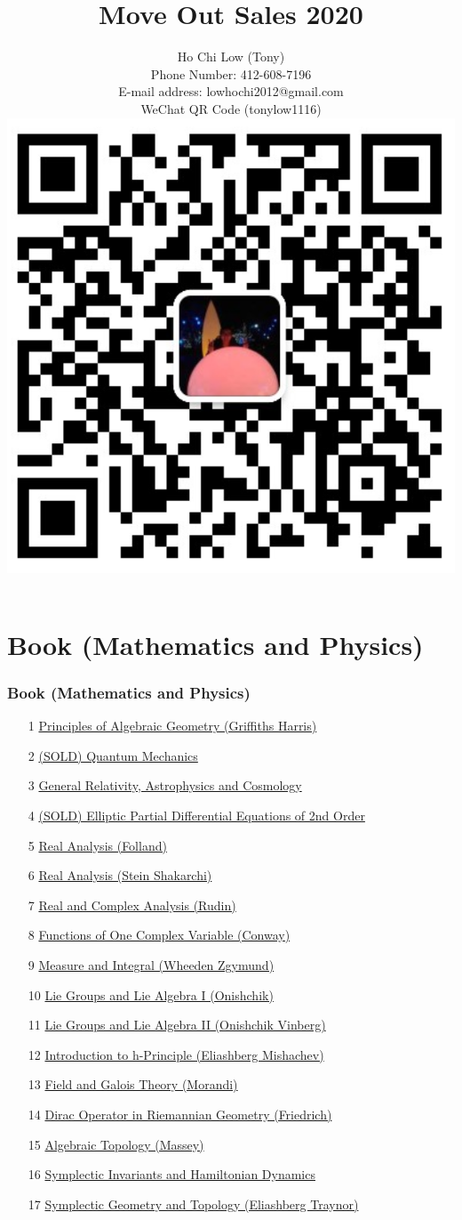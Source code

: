 \documentclass[t]{beamer}
\title{Move Out Sales 2020}
\author{Ho Chi Low (Tony) \\ Phone Number: 412-608-7196 \\
E-mail address: lowhochi2012@gmail.com \\
WeChat QR Code (tonylow1116) \\
\includegraphics[height=.4\textheight]{wechat_QRcode.png}
}
\newcommand{\hlink}[2]{\hyperlink{#1}{#2}}
\begin{document}
\frame{\titlepage}
\section{Book (Mathematics and Physics)}

\begin{frame}[allowframebreaks]
\frametitle{Book (Mathematics and Physics)}
\begin{enumerate}
\item[1] \hlink{AG}{Principles of Algebraic Geometry (Griffiths Harris)}
\item[2] \hlink{QM}{(SOLD) Quantum Mechanics}
\item[3] \hlink{GAC}{General Relativity, Astrophysics and Cosmology}
\item[4] \hlink{ePDE}{(SOLD) Elliptic Partial Differential Equations of 2nd Order}
\item[5] \hlink{RAF}{Real Analysis (Folland)}
\item[6] \hlink{RASS}{Real Analysis (Stein Shakarchi)}
\item[7] \hlink{RCA}{Real and Complex Analysis (Rudin)}
\item[8] \hlink{CVC}{Functions of One Complex Variable (Conway)}
\item[9] \hlink{MWZ}{Measure and Integral (Wheeden Zgymund)}
\item[10] \hlink{LGA1}{Lie Groups and Lie Algebra I (Onishchik)}
\item[11] \hlink{LGA2}{Lie Groups and Lie Algebra II (Onishchik Vinberg)}
\item[12] \hlink{hPE}{Introduction to h-Principle (Eliashberg Mishachev)}
\item[13] \hlink{GT}{Field and Galois Theory (Morandi)}
\item[14] \hlink{DF}{Dirac Operator in Riemannian Geometry (Friedrich)}
\item[15] \hlink{ATM}{Algebraic Topology (Massey)}
\item[16] \hlink{SHZ}{Symplectic Invariants and Hamiltonian Dynamics}
\item[17] \hlink{SET}{Symplectic Geometry and Topology (Eliashberg Traynor)}
\end{enumerate}
\end{frame}
\end{document}
